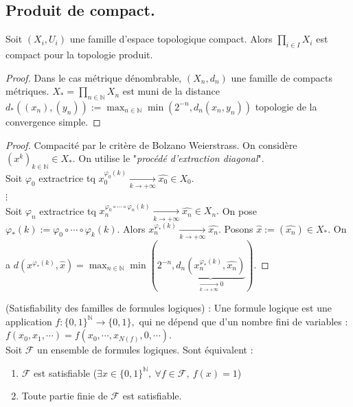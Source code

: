 \subsection{Produit de compact.}
\begin{theoreme}[Tychonov]
    Soit $(X_i,U_i)$ une famille d'espace topologique compact. Alors $\prod\limits_{i\in I}^{} X_i $ est compact pour la topologie produit.
\end{theoreme}
\begin{proof}
    Dans le cas métrique dénombrable, $(X_n,d_n)$ une famille de compacts métriques. $X_*=\prod\limits_{n\in \mathbb{N} }^{} X_n $ est muni de la distance $d_*((x_{n}),(y_n)):=\max_{n\in \mathbb{N} }\min\left( 2^{-n},d_n(x_n,y_n) \right) $ topologie de la convergence simple.
\end{proof}
\begin{proof}
    Compacité par le critère de Bolzano Weierstrass. On considère $(x^k)_{k\in \mathbb{N} }\in X_*.$ On utilise le "\textit{procédé d'extraction diagonal}".  \\
    Soit $\varphi _0$ extractrice tq $x_0^{\varphi _0(k)}\underset{k\to +\infty}{\longrightarrow} \hat{x_0}\in X_0.$ \\
    $\vdots$\\
    Soit $\varphi _n$ extractrice tq $x_n^{\varphi _0\circ\cdots\circ\varphi _n(k)}\underset{k\to +\infty}{\longrightarrow} \hat{x_n}\in X_n.$
    On pose $\varphi _*(k):=\varphi _0\circ\cdots\circ\varphi _k(k)$. Alors $x_n^{\varphi _*(k)}\underset{k\to +\infty}{\longrightarrow} \hat{x_n}$. Posons $\hat{x}:=(\hat{x_n})\in X_*.$ On a $d(x^{\varphi _*(k)},\hat{x})=\max_{n\in \mathbb{N} }\min(2^{-n}, \underbrace{d_n(x_n^{\varphi _*(k)},\hat{x_n})}_{\underset{k\to +\infty}{\longrightarrow} 0})$.
\end{proof}
\begin{ex}
    (Satisfiability des familles de formules logiques) : Une formule logique est une application $f: \{0,1\} ^\mathbb{N} \to \{0,1\} ,$ qui ne dépend que d'un nombre fini de variables : $f(x_0,x_1,\cdots) = f(x_0,\cdots,x_{N(f)},0,\cdots)$. \\
    Soit $\mathcal{F}$ un ensemble de formules logiques. Sont équivalent :
    \begin{enumerate}
        \item $\mathcal{F}$ est satisfiable ($\exists x\in \{0,1\} ^\mathbb{N} ,\ \forall f\in \mathcal{F},\ f(x)=1$)
        \item Toute partie finie de $\mathcal{F}$ est satisfiable.
    \end{enumerate}
\end{ex}
